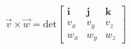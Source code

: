 \documentclass[preview]{standalone}
\begin{document}
\begin{align*}
\vec{v} \times \vec{w} = \text{det}\begin{bmatrix} \mathbf{i} & \mathbf{j} & \mathbf{k} \\ v_x & v_y & v_z \\ w_x & w_y & w_z \end{bmatrix}
\end{align*}
\end{document}
